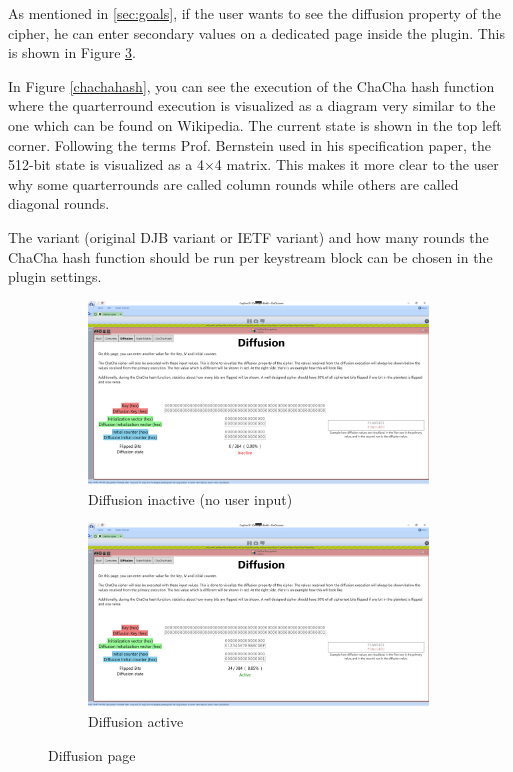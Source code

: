 \par

As mentioned in \ref{sec:goals}, if the user wants to see the diffusion property of the cipher, he can enter secondary values on a dedicated page inside the plugin. This is shown in Figure \ref{diffusion}.

\par

In Figure \ref{chachahash}, you can see the execution of the ChaCha hash function where the quarterround execution is visualized as a diagram very similar to the one which can be found on Wikipedia. The current state is shown in the top left corner. Following the terms Prof. Bernstein used in his specification paper, the 512-bit state is visualized as a 4$\times$4 matrix. This makes it more clear to the user why some quarterrounds are called column rounds while others are called diagonal rounds.

\par

The variant (original DJB variant or IETF variant) and how many rounds the ChaCha hash function should be run per keystream block can be chosen in the plugin settings.

\begin{figure}
\centering
\begin{subfigure}[t]{.5\textwidth}
  \centering
  \includegraphics[width=0.99\textwidth]{figures/diffusion-inactive}
  \caption{Diffusion inactive (no user input)}
  \label{diffusion.inactive}
\end{subfigure}%
\begin{subfigure}[t]{.5\textwidth}
  \centering
  \includegraphics[width=0.99\textwidth]{figures/diffusion-active}
  \caption{Diffusion active}
  \label{diffusion.active}
\end{subfigure}
\caption{Diffusion page}
\label{diffusion}
\end{figure}

